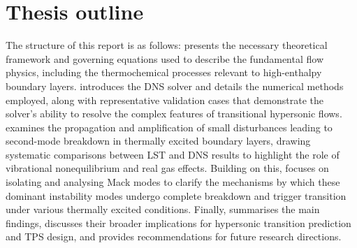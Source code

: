 \section{Thesis outline}
The structure of this report is as follows:  presents the necessary theoretical framework and governing equations used to describe the fundamental flow physics, including the thermochemical processes relevant to high-enthalpy boundary layers.  introduces the \gls{DNS} solver and details the numerical methods employed, along with representative validation cases that demonstrate the solver’s ability to resolve the complex features of transitional hypersonic flows.  examines the propagation and amplification of small disturbances leading to second-mode breakdown in thermally excited boundary layers, drawing systematic comparisons between \gls{LST} and \gls{DNS} results to highlight the role of vibrational nonequilibrium and real gas effects. Building on this,  focuses on isolating and analysing Mack modes to clarify the mechanisms by which these dominant instability modes undergo complete breakdown and trigger transition under various thermally excited conditions. Finally,  summarises the main findings, discusses their broader implications for hypersonic transition prediction and \gls{TPS} design, and provides recommendations for future research directions.